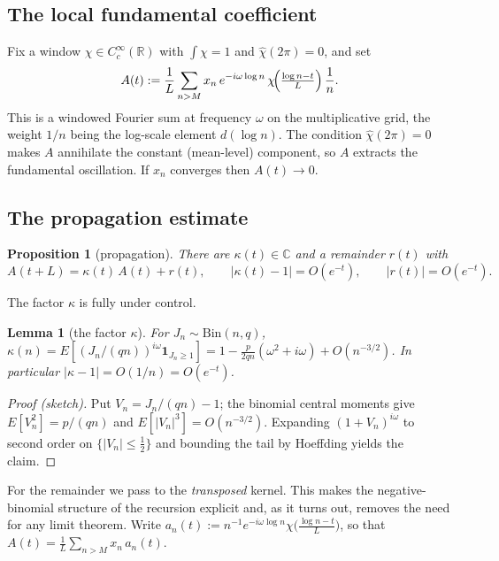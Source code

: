 \documentclass[11pt]{article}
\newtheorem{proposition}[theorem]{Proposition}
\newtheorem{lemma}[theorem]{Lemma}
\theoremstyle{definition}
\newcommand{\R}{\mathbb{R}}
\begin{document}
\subsection{The local fundamental coefficient}

Fix a window $\chi\in C_c^\infty(\R)$ with $\int\chi=1$ and
$\hat\chi(2\pi)=0$, and set
\begin{equation}\label{eq:Adef}
  A(t):=\frac1L\sum_{n>M}x_n\,e^{-i\omega\log n}\,
        \chi\!\Bigl(\tfrac{\log n-t}{L}\Bigr)\,\frac1n .
\end{equation}
This is a windowed Fourier sum at frequency $\omega$ on the
multiplicative grid, the weight $1/n$ being the log-scale element
$d(\log n)$. The condition $\hat\chi(2\pi)=0$ makes $A$ annihilate the
constant (mean-level) component, so $A$ extracts the fundamental
oscillation. If $x_n$ converges then $A(t)\to0$.

\subsection{The propagation estimate}

\begin{proposition}[propagation]\label{prop:prop}
  There are $\kappa(t)\in\mathbb C$ and a remainder $r(t)$ with
  \[
    A(t+L)=\kappa(t)\,A(t)+r(t),\qquad
    |\kappa(t)-1|=O(e^{-t}),\qquad |r(t)|=O(e^{-t}).
  \]
\end{proposition}

The factor $\kappa$ is fully under control.

\begin{lemma}[the factor $\kappa$]\label{lem:kappa}
  For $J_n\sim\mathrm{Bin}(n,q)$,
  $\kappa(n)=E[(J_n/(qn))^{i\omega}\mathbf 1_{J_n\ge1}]
  =1-\tfrac{p}{2qn}(\omega^2+i\omega)+O(n^{-3/2})$. In particular
  $|\kappa-1|=O(1/n)=O(e^{-t})$.
\end{lemma}

\begin{proof}[Proof (sketch)]
  Put $V_n=J_n/(qn)-1$; the binomial central moments give
  $E[V_n^2]=p/(qn)$ and $E[|V_n|^3]=O(n^{-3/2})$. Expanding
  $(1+V_n)^{i\omega}$ to second order on $\{|V_n|\le\tfrac12\}$ and
  bounding the tail by Hoeffding yields the claim.
\end{proof}

For the remainder we pass to the \emph{transposed} kernel. This makes
the negative-binomial structure of the recursion explicit and, as it
turns out, removes the need for any limit theorem. Write
$a_n(t):=n^{-1}e^{-i\omega\log n}\chi\bigl(\tfrac{\log n-t}L\bigr)$, so
that $A(t)=\frac1L\sum_{n>M}x_n\,a_n(t)$.
\end{document}
